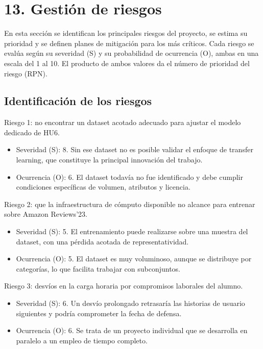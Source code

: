 \documentclass[
11pt, %
]{charter}
\begin{document}
\section{13. Gestión de riesgos}
\label{sec:riesgos}

En esta sección se identifican los principales riesgos del proyecto, se estima su prioridad y se definen planes de mitigación para los más críticos. Cada riesgo se evalúa según su severidad (S) y su probabilidad de ocurrencia (O), ambas en una escala del 1 al 10. El producto de ambos valores da el número de prioridad del riesgo (RPN).

\subsection{Identificación de los riesgos}

Riesgo 1: no encontrar un dataset acotado adecuado para ajustar el modelo dedicado de HU6.
\begin{itemize}
  \item Severidad (S): 8. Sin ese dataset no es posible validar el enfoque de transfer learning, que constituye la principal innovación del trabajo.
  \item Ocurrencia (O): 6. El dataset todavía no fue identificado y debe cumplir condiciones específicas de volumen, atributos y licencia.
\end{itemize}

Riesgo 2: que la infraestructura de cómputo disponible no alcance para entrenar sobre Amazon Reviews'23.
\begin{itemize}
  \item Severidad (S): 5. El entrenamiento puede realizarse sobre una muestra del dataset, con una pérdida acotada de representatividad.
  \item Ocurrencia (O): 5. El dataset es muy voluminoso, aunque se distribuye por categorías, lo que facilita trabajar con subconjuntos.
\end{itemize}

Riesgo 3: desvíos en la carga horaria por compromisos laborales del alumno.
\begin{itemize}
  \item Severidad (S): 6. Un desvío prolongado retrasaría las historias de usuario siguientes y podría comprometer la fecha de defensa.
  \item Ocurrencia (O): 6. Se trata de un proyecto individual que se desarrolla en paralelo a un empleo de tiempo completo.
\end{itemize}
\end{document}
